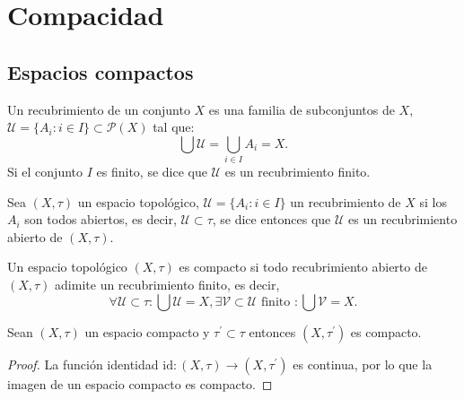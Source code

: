 \section{Compacidad}

\subsection{Espacios compactos}

\begin{definición}[Recubrimiento]
    Un recubrimiento de un conjunto $X$ es una familia de subconjuntos de $X$, $\mathcal{U} = \{A_i : i \in I\} \subset \mathcal{P}(X)$ tal que:
    $$\bigcup \mathcal{U} = \bigcup_{i \in I} A_i = X.$$
    Si el conjunto $I$ es finito, se dice que $\mathcal{U}$ es un recubrimiento finito.
\end{definición}
\begin{definición}
    Sea $(X, \tau)$ un espacio topológico, $\mathcal{U} = \{A_i : i \in I\}$ un recubrimiento de $X$ si los $A_i$ son todos abiertos, es decir, $\mathcal{U} \subset \tau$, se dice entonces que $\mathcal{U}$ es un recubrimiento abierto de $(X, \tau)$.
\end{definición}
\begin{definición}[Compacto]
    Un espacio topológico $(X, \tau)$ es compacto si todo recubrimiento abierto de $(X, \tau)$ adimite un recubrimiento finito, es decir, 
    $$\forall \mathcal{U} \subset \tau : \bigcup \mathcal{U} = X, \exists \mathcal{V} \subset \mathcal{U} \text{ finito } : \bigcup \mathcal{V} = X.$$   
\end{definición}
\begin{proposición}
    Sean $(X, \tau)$ un espacio compacto y $\tau^{\prime} \subset \tau$ entonces $(X, \tau^{\prime})$ es compacto.
\end{proposición}
\begin{proof}
    La función identidad $\mathrm{id} : (X, \tau) \to (X, \tau^{\prime})$ es continua, por lo que la imagen de un espacio compacto es compacto.
\end{proof}
